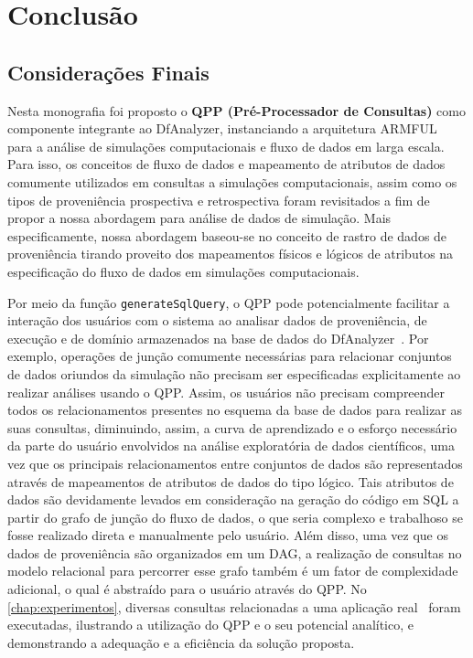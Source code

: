 
\chapter{Conclusão}%
\label{chap:conclusao}

\section{Considerações Finais}

Nesta monografia foi proposto o \textbf{QPP (Pré-Processador de Consultas)} como componente integrante ao DfAnalyzer, instanciando a arquitetura ARMFUL~\cite{silva2017raw} para a análise de simulações computacionais e fluxo de dados em larga escala. Para isso, os conceitos de fluxo de dados e mapeamento de atributos de dados comumente utilizados em consultas a simulações computacionais, assim como os tipos de proveniência prospectiva e retrospectiva foram revisitados a fim de propor a nossa abordagem para análise de dados de simulação. Mais especificamente, nossa abordagem baseou-se no conceito de rastro de dados de proveniência tirando proveito dos mapeamentos físicos e lógicos de atributos na especificação do fluxo de dados em simulações computacionais. 

Por meio da função \texttt{generateSqlQuery}, o QPP pode potencialmente facilitar a interação dos usuários com o sistema ao analisar dados de proveniência, de execução e de domínio armazenados na base de dados do DfAnalyzer~\cite{gadelha2012mtcprov}. Por exemplo, operações de junção comumente necessárias para relacionar conjuntos de dados oriundos da simulação não precisam ser especificadas explicitamente ao realizar análises usando o QPP. Assim, os usuários não precisam compreender todos os relacionamentos presentes no esquema da base de dados para realizar as suas consultas, diminuindo, assim, a curva de aprendizado e o esforço necessário da parte do usuário envolvidos na análise exploratória de dados científicos, uma vez que os principais relacionamentos entre conjuntos de dados são representados através de mapeamentos de atributos de dados do tipo lógico. Tais atributos de dados são devidamente levados em consideração na geração do código em SQL a partir do grafo de junção do fluxo de dados, o que seria complexo e trabalhoso se fosse realizado direta e manualmente pelo usuário.
Além disso, uma vez que os dados de proveniência são organizados em um DAG, a realização de consultas no modelo relacional para percorrer esse grafo também é um fator de complexidade adicional, o qual é abstraído para o usuário através do QPP.
No \autoref{chap:experimentos}, diversas consultas relacionadas a uma aplicação real~\cite{silva2016situ} foram executadas, ilustrando a utilização do QPP e o seu potencial analítico, e demonstrando a adequação e a eficiência da solução proposta.

